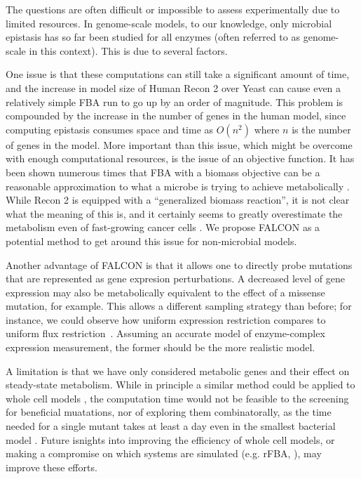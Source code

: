 The questions are often
difficult or impossible to assess experimentally due to limited
resources.  In genome-scale models, to our knowledge, only microbial
epistasis has so far been studied for all enzymes (often referred to
as genome-scale in this context). This is due to several factors.

One issue is that these computations can still take a significant
amount of time, and the increase in model size of Human Recon 2 over
Yeast can cause even a relatively simple FBA run to go up by an order
of magnitude.  This problem is compounded by the increase in the
number of genes in the human model, since computing epistasis consumes
space and time as $O(n^2)$ where $n$ is the number of genes in the
model. More important than this issue, which might be overcome with
enough computational resources, is the issue of an objective
function. It has been shown numerous times that FBA with a biomass
objective can be a reasonable approximation to what a microbe is
trying to achieve metabolically
\citep{Schuetz2012, Fong2004, Varma1994}. While Recon 2
is equipped with a ``generalized biomass reaction'', it is not clear
what the meaning of this is, and it certainly seems to greatly overestimate
the metabolism even of fast-growing cancer cells \citep{Mehrara2009}.
We propose FALCON as a potential method to get around this issue
for non-microbial models.

Another advantage of FALCON is that it allows one to directly probe
mutations that are represented as gene expresion perturbations. A
decreased level of gene expression may also be metabolically
equivalent to the effect of a missense mutation, for example. This
allows a different sampling strategy than before; for instance, we
could observe how uniform expression restriction compares to uniform
flux restriction~\citep{Xu2012}. Assuming an accurate model of
enzyme-complex expression measurement, the former should be the more
realistic model.

A limitation is that we have only considered metabolic genes and their
effect on steady-state metabolism. While in principle a similar method
could be applied to whole cell models \citep{Karr2012, O'Brien2013}, the
computation time would not be feasible to the screening for beneficial
muatations, nor of exploring them combinatorally, as the time needed
for a single mutant takes at least a day even in the smallest
bacterial model \citep{Karr2012}. Future isnights into improving the
efficiency of whole cell models, or making a compromise on which
systems are simulated (e.g. rFBA, \citep{Covert2001}), may improve
these efforts.

